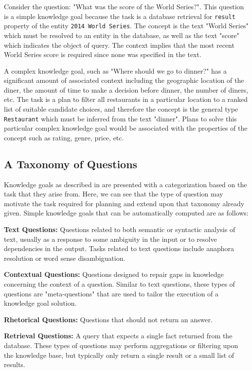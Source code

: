 \documentclass[11pt,letterpaper]{article}
\begin{document}
Consider the question: "What was the score of the World Series?". This question is a simple knowledge goal because the task is a database retrieval for \texttt{result} property of the entity \texttt{2014 World Series}. The concept is the text "World Series" which must be resolved to an entity in the database, as well as the text "score" which indicates the object of query. The context implies that the most recent World Series score is required since none was specified in the text.

A complex knowledge goal, such as "Where should we go to dinner?" has a significant amount of associated context including the geographic location of the diner, the amount of time to make a decision before dinner, the number of diners, etc. The task is a plan to filter all restaurants in a particular location to a ranked list of suitable candidate choices, and therefore the concept is the general type \texttt{Restaurant} which must be inferred from the text "dinner". Plans to solve this particular complex knowledge goal would be associated with the properties of the concept such as rating, genre, price, etc.


\subsection{A Taxonomy of Questions}

Knowledge goals as described in \cite{ram_knowledge_1990} are presented with a categorization based on the task that they arise from. Here, we can see that the type of question may motivate the task required for planning and extend upon that taxonomy already given. Simple knowledge goals that can be automatically computed are as follows:

\textbf{Text Questions:} Questions related to both semantic or syntactic analysis of text, usually as a response to some ambiguity in the input or to resolve dependencies in the output. Tasks related to text questions include anaphora resolution or word sense disambiguation.

\textbf{Contextual Questions:} Questions designed to repair gaps in knowledge concerning the context of a question. Similar to text questions, these types of questions are "meta-questions" that are used to tailor the execution of a knowledge goal solution.

\textbf{Rhetorical Questions:} Questions that should not return an answer.

\textbf{Retrieval Questions:} A query that expects a single fact returned from the database. These types of questions may perform aggregations or filtering upon the knowledge base, but typically only return a single result or a small list of results.
\end{document}
